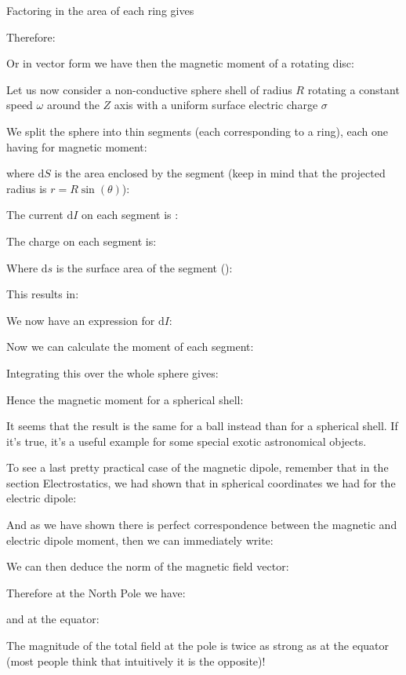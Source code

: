 	Factoring in the area of each ring gives
	
	Therefore:
	
	Or in vector form we have then the magnetic moment of a rotating disc:
	
	
	Let us now consider a non-conductive sphere shell of radius $R$ rotating a constant speed $\omega$ around the $Z$ axis with a uniform surface electric charge $\sigma$
	
	We split the sphere into thin segments (each corresponding to a ring), each one having for magnetic moment:
	
	where $\mathrm{d}S$ is the area enclosed by the segment (keep in mind that the projected radius is $r=R\sin(\theta)$):
	
	The current $\mathrm{d}I$ on each segment is :
	
	The charge on each segment is:
	
	Where $\mathrm{d}s$ is the surface area of the segment ():
	
	This results in:
	
	We now have an expression for $\mathrm{d}I$:
	
	Now we can calculate the moment of each segment:
	
	Integrating this over the whole sphere gives:
	
	Hence the magnetic moment for a spherical shell:
	
	\begin{tcolorbox}[title=Remark,colframe=black,arc=10pt]
	It seems that the result is the same for a ball instead than for a spherical shell. If it's true, it's a useful example for some special exotic astronomical objects.
	\end{tcolorbox}
	
	To see a last pretty practical case of the magnetic dipole, remember that in the section Electrostatics, we had shown that in spherical coordinates we had for the electric dipole:
	
	And as we have shown there is perfect correspondence between the magnetic and electric dipole moment, then we can immediately write:
	
	We can then deduce the norm of the magnetic field vector:
	
	Therefore at the North Pole we have:
	
	and at the equator:
	
	The magnitude of the total field at the pole is twice as strong as at the equator (most people think that intuitively it is the opposite)!
	
